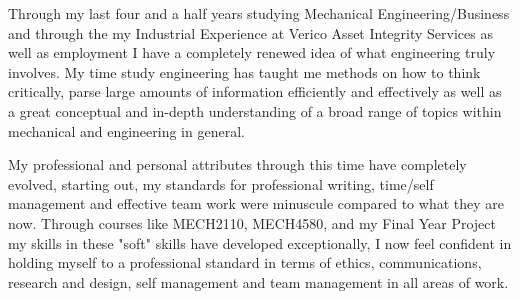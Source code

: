 \documentclass{UoNMCHA}
\numberwithin{equation}{section}
\begin{document}
    Through my last four and a half years studying Mechanical Engineering/Business and through the my Industrial Experience at Verico Asset Integrity Services as well as employment I have a completely renewed idea of what engineering truly involves. My time study engineering has taught me methods on how to think critically, parse large amounts of information efficiently and effectively as well as a great conceptual and in-depth understanding of a broad range of topics within mechanical and engineering in general.
    
    My professional and personal attributes through this time have completely evolved, starting out, my standards for professional writing, time/self management and effective team work were minuscule compared to what they are now. Through courses like MECH2110, MECH4580, and my Final Year Project my skills in these "soft" skills have developed exceptionally, I now feel confident in holding myself to a professional standard in terms of ethics, communications, research and design, self management and team management in all areas of work.
    
    
\newpage
\end{document}

